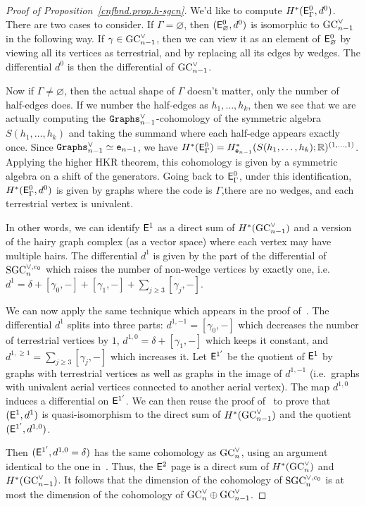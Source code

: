 \begin{proof}[Proof of Proposition~\ref{cnfbnd.prop.h-sgcn}]
  We'd like to compute $H^{*}(\EE^{0}_{\Gamma}, d^{0})$.
  There are two cases to consider.
  If $\Gamma = \varnothing$, then $(\EE^{0}_{\varnothing}, d^{0})$ is isomorphic to $\GC_{n-1}^{\vee}$ in the following way.
  If $\gamma \in \GC_{n-1}^{\vee}$, then we can view it as an element of $\EE^{0}_{\varnothing}$ by viewing all its vertices as terrestrial, and by replacing all its edges by wedges.
  The differential $d^{0}$ is then the differential of $\GC_{n-1}^{\vee}$.

  Now if $\Gamma \neq \varnothing$, then the actual shape of $\Gamma$ doesn't matter, only the number of half-edges does.
  If we number the half-edges as $h_{1}, \dots, h_{k}$, then we see that we are actually computing the $\Graphs_{n-1}^{\vee}$-cohomology of the symmetric algebra $S(h_{1}, \dots, h_{k})$ and taking the summand where each half-edge appears exactly once.
  Since $\Graphs_{n-1}^{\vee} \simeq \en[n-1]$, we have $H^{*}(\EE^{0}_{\Gamma}) = H^{*}_{\en[n-1]}(S(h_{1}, \dots, h_{k}); \R)^{(1, \dots, 1)}$.
  Applying the higher HKR theorem, this cohomology is given by a symmetric algebra on a shift of the generators.
  Going back to $\EE^{0}_{\Gamma}$, under this identification, $H^{*}(\EE^{0}_{\Gamma}, d^{0})$ is given by graphs where the code is $\Gamma$,there are no wedges, and each terrestrial vertex is univalent.

  In other words, we can identify $\EE^{1}$ as a direct sum of $H^{*}(\GC_{n-1}^{\vee})$ and a version of the hairy graph complex (as a vector space) where each vertex may have multiple hairs.
  The differential $d^{1}$ is given by the part of the differential of $\SGC_{n}^{\vee,c_{0}}$ which raises the number of non-wedge vertices by exactly one, i.e. $d^{1} = \delta + [\gamma_{0}, -] + [ \gamma_{1}, -] + \sum_{j \geq 3} [\gamma_{j}, -]$.

  We can now apply the same technique which appears in the proof of~\cite[Claim~2]{Willwacher2016}.
  The differential $d^{1}$ splits into three parts: $d^{1,-1} = [\gamma_{0},-]$ which decreases the number of terrestrial vertices by $1$, $d^{1,0} = \delta + [\gamma_{1}, -]$ which keeps it constant, and $d^{1,\geq 1} = \sum_{j \geq 3} [\gamma_{j}, -]$ which increases it.
  Let $\EE^{1'}$ be the quotient of $\EE^{1}$ by graphs with  terrestrial vertices as well as graphs in the image of $d^{1,-1}$ (i.e.\ graphs with univalent aerial vertices connected to another aerial vertex).
  The map $d^{1,0}$ induces a differential on $\EE^{1'}$.
  We can then reuse the proof of~\cite[Claim~2]{Willwacher2016} to prove that $(\EE^{1}, d^{1})$ is quasi-isomorphism to the direct sum of $H^{*}(\GC_{n-1}^{\vee})$ and the quotient $(\EE^{1'}, d^{1,0})$.

  Then $(\EE^{1'}, d^{1,0} = \delta)$ has the same cohomology as $\GC_{n}^{\vee}$, using an argument identical to the one in~\cite[Appendix~F.2.1]{Willwacher2016}.
  Thus, the $\EE^{2}$ page is a direct sum of $H^{*}(\GC_{n}^{\vee})$ and $H^{*}(\GC_{n-1}^{\vee})$.
  It follows that the dimension of the cohomology of $\SGC_{n}^{\vee,c_{0}}$ is at most the dimension of the cohomology of $\GC_{n}^{\vee} \oplus \GC_{n-1}^{\vee}$.
\end{proof}

